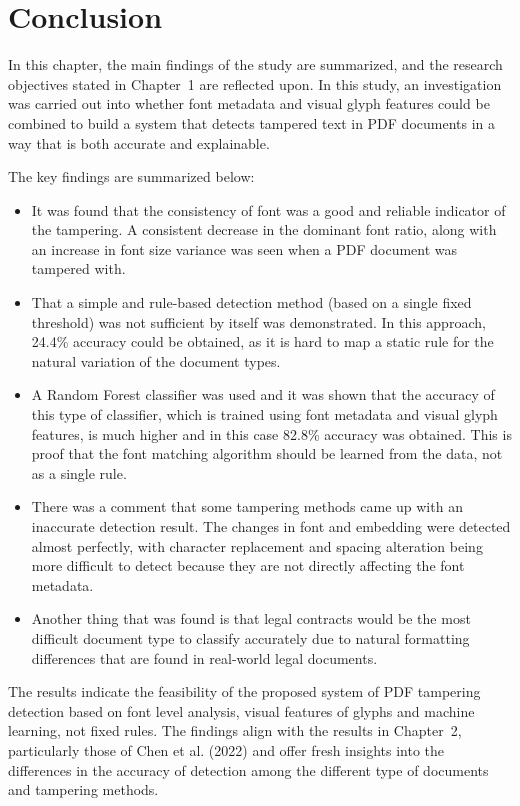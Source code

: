 \section{Conclusion}

In this chapter, the main findings of the study are summarized, and the research objectives stated in Chapter~1 are reflected upon. In this study, an investigation was carried out into whether font metadata and visual glyph features could be combined to build a system that detects tampered text in PDF documents in a way that is both accurate and explainable.

The key findings are summarized below:

\begin{itemize}
    \item It was found that the consistency of font was a good and reliable indicator of the tampering. A consistent decrease in the dominant font ratio, along with an increase in font size variance was seen when a PDF document was tampered with.
    \item That a simple and rule-based detection method (based on a single fixed threshold) was not sufficient by itself was demonstrated. In this approach, 24.4\% accuracy could be obtained, as it is hard to map a static rule for the natural variation of the document types.
    \item A Random Forest classifier was used and it was shown that the accuracy of this type of classifier, which is trained using font metadata and visual glyph features, is much higher and in this case 82.8\% accuracy was obtained. This is proof that the font matching algorithm should be learned from the data, not as a single rule.
    \item There was a comment that some tampering methods came up with an inaccurate detection result. The changes in font and embedding were detected almost perfectly, with character replacement and spacing alteration being more difficult to detect because they are not directly affecting the font metadata.
    \item Another thing that was found is that legal contracts would be the most difficult document type to classify accurately due to natural formatting differences that are found in real-world legal documents.
\end{itemize}

\noindent The results indicate the feasibility of the proposed system of PDF tampering detection based on font level analysis, visual features of glyphs and machine learning, not fixed rules. The findings align with the results in Chapter~2, particularly those of Chen et al. (2022) \cite{Chen2022FontForgery} and offer fresh insights into the differences in the accuracy of detection among the different type of documents and tampering methods.

